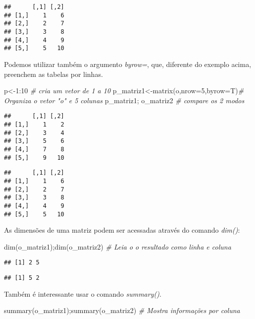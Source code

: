 \documentclass[
]{book}
\newenvironment{Shaded}{\begin{snugshade}}{\end{snugshade}}
\newcommand{\AttributeTok}[1]{\textcolor[rgb]{0.77,0.63,0.00}{#1}}
\newcommand{\CommentTok}[1]{\textcolor[rgb]{0.56,0.35,0.01}{\textit{#1}}}
\newcommand{\DecValTok}[1]{\textcolor[rgb]{0.00,0.00,0.81}{#1}}
\newcommand{\FunctionTok}[1]{\textcolor[rgb]{0.00,0.00,0.00}{#1}}
\newcommand{\NormalTok}[1]{#1}
\newcommand{\OtherTok}[1]{\textcolor[rgb]{0.56,0.35,0.01}{#1}}
\newcommand{\SpecialCharTok}[1]{\textcolor[rgb]{0.00,0.00,0.00}{#1}}
\begin{document}
\begin{verbatim}
##      [,1] [,2]
## [1,]    1    6
## [2,]    2    7
## [3,]    3    8
## [4,]    4    9
## [5,]    5   10
\end{verbatim}

Podemos utilizar também o argumento \emph{byrow=}, que, diferente do exemplo acima, preenchem as tabelas por linhas.

\begin{Shaded}
\begin{Highlighting}[]
\NormalTok{p}\OtherTok{\textless{}{-}}\DecValTok{1}\SpecialCharTok{:}\DecValTok{10} \CommentTok{\# cria um vetor de 1 a 10}
\NormalTok{p\_matriz1}\OtherTok{\textless{}{-}}\FunctionTok{matrix}\NormalTok{(o,}\AttributeTok{nrow=}\DecValTok{5}\NormalTok{,}\AttributeTok{byrow=}\NormalTok{T)}\CommentTok{\# Organiza o vetor "o" e 5 colunas}
\NormalTok{p\_matriz1; o\_matriz2 }\CommentTok{\# compare os 2 modos}
\end{Highlighting}
\end{Shaded}

\begin{verbatim}
##      [,1] [,2]
## [1,]    1    2
## [2,]    3    4
## [3,]    5    6
## [4,]    7    8
## [5,]    9   10
\end{verbatim}

\begin{verbatim}
##      [,1] [,2]
## [1,]    1    6
## [2,]    2    7
## [3,]    3    8
## [4,]    4    9
## [5,]    5   10
\end{verbatim}

As dimensões de uma matriz podem ser acessadas através do comando \emph{dim()}:

\begin{Shaded}
\begin{Highlighting}[]
\FunctionTok{dim}\NormalTok{(o\_matriz1);}\FunctionTok{dim}\NormalTok{(o\_matriz2) }\CommentTok{\# Leia o o resultado como linha e coluna}
\end{Highlighting}
\end{Shaded}

\begin{verbatim}
## [1] 2 5
\end{verbatim}

\begin{verbatim}
## [1] 5 2
\end{verbatim}

Também é interessante usar o comando \emph{summary()}.

\begin{Shaded}
\begin{Highlighting}[]
\FunctionTok{summary}\NormalTok{(o\_matriz1);}\FunctionTok{summary}\NormalTok{(o\_matriz2) }\CommentTok{\# Mostra informações por coluna}
\end{Highlighting}
\end{Shaded}
\end{document}

